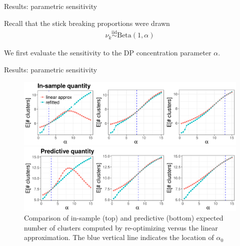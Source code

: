 \documentclass[10pt]{beamer}\usepackage[]{graphicx}\usepackage[]{color}
\newenvironment{knitrout}{}{} %
\begin{document}
\begin{frame}{Results: parametric sensitivity}

Recall that the stick breaking proportions were drawn 
\begin{align*}
\nu_k \overset{\text{iid}}{\sim} \text{Beta}(1, \alpha)
\end{align*}

We first evaluate the sensitivity to the DP concentration parameter $\alpha$. 

\end{frame}
\begin{frame}{Results: parametric sensitivity}

\begin{figure}
\centering
\begin{knitrout}
\color{fgcolor}

{\centering \includegraphics[width=0.98\linewidth,height=0.294\linewidth]{figure/param_sens_plot_thresh_0-1} 

}



\end{knitrout}
\begin{knitrout}
\color{fgcolor}

{\centering \includegraphics[width=0.98\linewidth,height=0.294\linewidth]{figure/param_sens_plot_thresh_0b-1} 

}



\end{knitrout}
\caption{Comparison of in-sample (top) and predictive (bottom) expected number of clusters computed by re-optimizing versus the linear approximation. 
The blue vertical line indicates the location of $\alpha_0$}
\end{figure}

\end{frame}
\end{document}
